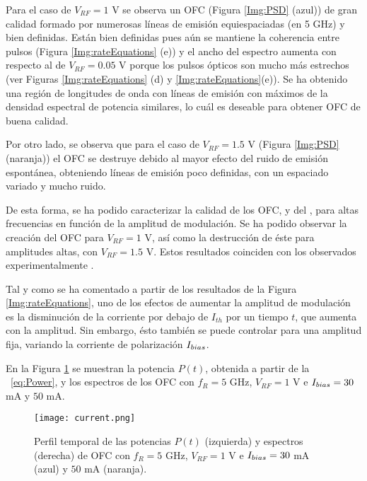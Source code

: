 		Para el caso de $V_{RF} = 1$ V se observa un OFC (Figura \ref{Img:PSD} (azul)) de gran calidad formado por numerosas l\'ineas de emisión equiespaciadas (en 5 GHz) y bien definidas. Están bien definidas pues aún se mantiene la coherencia entre pulsos (Figura \ref{Img:rateEquations} (e)) y el ancho del espectro aumenta con respecto al de $V_{RF} = 0.05$ V porque los pulsos ópticos son mucho más estrechos (ver Figuras \ref{Img:rateEquations} (d) y \ref{Img:rateEquations}(e)). Se ha obtenido una regi\'on de longitudes de onda con l\'ineas de emisión con máximos de la densidad espectral de potencia similares, lo cuál es deseable para obtener OFC de buena calidad.

		Por otro lado, se observa que para el caso de $V_{RF} = 1.5$ V (Figura \ref{Img:PSD} (naranja)) el OFC se destruye debido al mayor efecto del ruido de emisión espont\'anea, obteniendo l\'ineas de emisión poco definidas, con un espaciado variado y mucho ruido.

		De esta forma, se ha podido caracterizar la calidad de los OFC, y del \gs, para altas frecuencias en función de la amplitud de modulaci\'on. Se ha podido observar la creaci\'on del OFC para $V_{RF} = 1$ V, as\'i como la destrucci\'on de éste para amplitudes altas, con $V_{RF} = 1.5$ V. Estos resultados coinciden con los observados experimentalmente \cite{artSim}.

		Tal y como se ha comentado a partir de los resultados de la Figura \ref{Img:rateEquations}, uno de los efectos de aumentar la amplitud de modulaci\'on es la disminuci\'on de la corriente por debajo de $I_{th}$ por un tiempo $t$, que aumenta con la amplitud. Sin embargo, \'esto también se puede controlar para una amplitud fija, variando la corriente de polarizaci\'on $I_{bias}$.

		En la Figura \ref{Img:current} se muestran la potencia $P(t)$, obtenida a partir de la \s\ \ref{eq:Power}, y los espectros de los OFC con $f_R = 5$ GHz, $V_{RF} = 1$ V e $I_{bias} = 30$ mA y $50$ mA.

			\begin{figure}[H]
				\centering
				\texttt{[image: current.png]}
				\caption{\label{Img:current}Perfil temporal de las potencias $P(t)$ (izquierda) y espectros (derecha) de OFC con $f_R = 5$ GHz, $V_{RF} = 1$ V e $I_{bias} = 30$ mA (azul) y $50$ mA (naranja).}	
			\end{figure}

